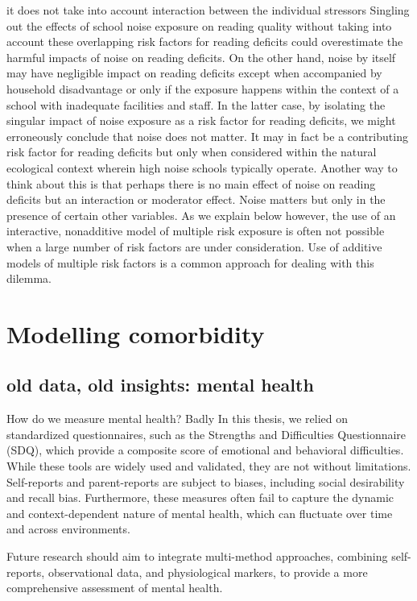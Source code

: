 \documentclass[
  letterpaper,
  DIV=11,
  numbers=noendperiod]{scrreport}
\begin{document}
it does not take into account interaction between the individual
stressors Singling out the effects of school noise exposure on reading
quality without taking into account these overlapping risk factors for
reading deficits could overestimate the harmful impacts of noise on
reading deficits. On the other hand, noise by itself may have negligible
impact on reading deficits except when accompanied by household
disadvantage or only if the exposure happens within the context of a
school with inadequate facilities and staff. In the latter case, by
isolating the singular impact of noise exposure as a risk factor for
reading deficits, we might erroneously conclude that noise does not
matter. It may in fact be a contributing risk factor for reading
deficits but only when considered within the natural ecological context
wherein high noise schools typically operate. Another way to think about
this is that perhaps there is no main effect of noise on reading
deficits but an interaction or moderator effect. Noise matters but only
in the presence of certain other variables. As we explain below however,
the use of an interactive, nonadditive model of multiple risk exposure
is often not possible when a large number of risk factors are under
consideration. Use of additive models of multiple risk factors is a
common approach for dealing with this dilemma.

\section{Modelling comorbidity}\label{modelling-comorbidity}

\subsection{old data, old insights: mental
health}\label{old-data-old-insights-mental-health}

How do we measure mental health? Badly In this thesis, we relied on
standardized questionnaires, such as the Strengths and Difficulties
Questionnaire (SDQ), which provide a composite score of emotional and
behavioral difficulties. While these tools are widely used and
validated, they are not without limitations. Self-reports and
parent-reports are subject to biases, including social desirability and
recall bias. Furthermore, these measures often fail to capture the
dynamic and context-dependent nature of mental health, which can
fluctuate over time and across environments.

Future research should aim to integrate multi-method approaches,
combining self-reports, observational data, and physiological markers,
to provide a more comprehensive assessment of mental health.
\end{document}

